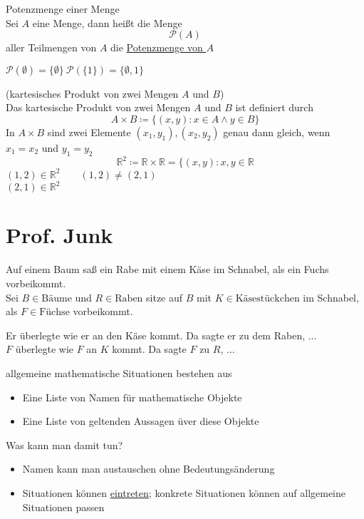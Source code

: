\documentclass[a4paper]{article}
\begin{document}
\begin{definitionbox}
	Potenzmenge einer Menge\\
	Sei $A$ eine Menge, dann heißt die Menge
	\[\mathcal{P}(A)\]
	aller Teilmengen von $A$ die \underline{Potenzmenge von $A$}
\end{definitionbox}
$\mathcal{P}(\emptyset) = \{\emptyset\}\:\mathcal{P}(\{1\}) = \{\emptyset, 1\}$
\begin{definitionbox}
	(kartesisches Produkt von zwei Mengen $A$ und $B$)\\
	Das kartesische Produkt von zwei Mengen $A$ und $B$ ist definiert durch
	\[A \times B \coloneqq \{(x,y): x \in A \wedge y \in B\}\]
	In $A \times B$ sind zwei Elemente $(x_1, y_1), (x_2, y_2)$ genau dann gleich, wenn $x_1 = x_2$ und $y_1 = y_2$
	\[\mathbb{R}^2 \coloneqq \mathbb{R} \times \mathbb{R} = \{(x, y): x, y \in \mathbb{R}\]
	\indent\indent $(1,2) \in \mathbb{R}^2 \qquad (1,2) \neq (2,1)$\\
	\indent\indent $(2,1) \in \mathbb{R}^2$
\end{definitionbox}

\section{Prof. Junk}
Auf einem Baum saß ein Rabe mit einem Käse im Schnabel, als ein Fuchs vorbeikommt.\\
Sei $B \in \text{Bäume}$ und $R \in \text{Raben}$ sitze auf $B$ mit $K \in \text{Käsestückchen}$ im Schnabel, als $F \in \text{Füchse}$ vorbeikommt.\par
Er überlegte wie er an den Käse kommt. Da sagte er zu dem Raben, ...\\
$F$ überlegte wie $F$ an $K$ kommt. Da sagte $F$ zu $R$, ...\\\par

allgemeine mathematische Situationen bestehen aus
\begin{itemize}
	\item Eine Liste von Namen für mathematische Objekte
	\item Eine Liste von geltenden Aussagen üver diese Objekte
\end{itemize}
Was kann man damit tun?
\begin{itemize}
	\item Namen kann man austauschen ohne Bedeutungsänderung
	\item Situationen können \underline{eintreten}; konkrete Situationen können auf allgemeine Situationen passen
\end{itemize}
\end{document}
